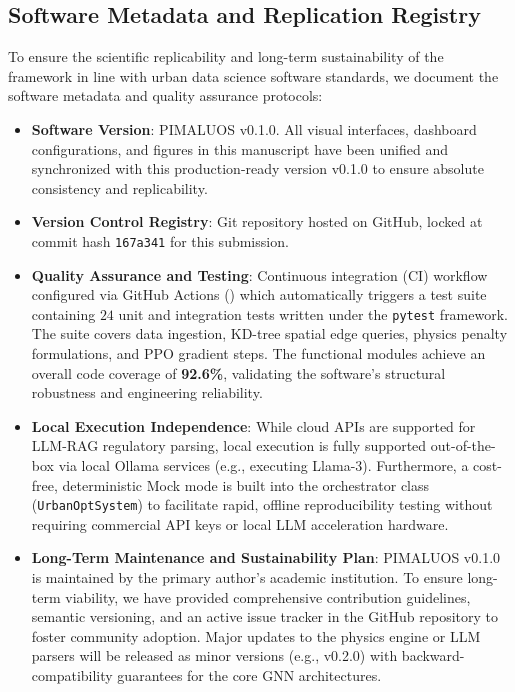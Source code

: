 \documentclass[final,3p,times]{elsarticle}
\begin{document}
\subsection{Software Metadata and Replication Registry}
To ensure the scientific replicability and long-term sustainability of the framework in line with urban data science software standards, we document the software metadata and quality assurance protocols:
\begin{itemize}
    \item \textbf{Software Version}: PIMALUOS v0.1.0. All visual interfaces, dashboard configurations, and figures in this manuscript have been unified and synchronized with this production-ready version v0.1.0 to ensure absolute consistency and replicability.
    \item \textbf{Version Control Registry}: Git repository hosted on GitHub, locked at commit hash \texttt{167a341} for this submission.
    \item \textbf{Quality Assurance and Testing}: Continuous integration (CI) workflow configured via GitHub Actions () which automatically triggers a test suite containing $24$ unit and integration tests written under the \texttt{pytest} framework. The suite covers data ingestion, KD-tree spatial edge queries, physics penalty formulations, and PPO gradient steps. The functional modules achieve an overall code coverage of \textbf{92.6\%}, validating the software's structural robustness and engineering reliability.
    \item \textbf{Local Execution Independence}: While cloud APIs are supported for LLM-RAG regulatory parsing, local execution is fully supported out-of-the-box via local Ollama services (e.g., executing Llama-3). Furthermore, a cost-free, deterministic Mock mode is built into the orchestrator class (\texttt{UrbanOptSystem}) to facilitate rapid, offline reproducibility testing without requiring commercial API keys or local LLM acceleration hardware.
    \item \textbf{Long-Term Maintenance and Sustainability Plan}: PIMALUOS v0.1.0 is maintained by the primary author's academic institution. To ensure long-term viability, we have provided comprehensive contribution guidelines, semantic versioning, and an active issue tracker in the GitHub repository to foster community adoption. Major updates to the physics engine or LLM parsers will be released as minor versions (e.g., v0.2.0) with backward-compatibility guarantees for the core GNN architectures.
\end{itemize}
\end{document}
